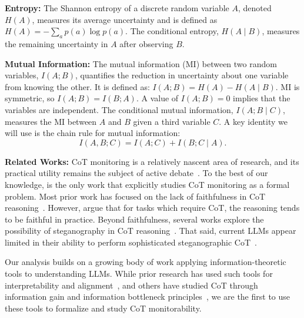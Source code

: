 \documentclass{article}
\theoremstyle{plain}
\begin{document}
\textbf{Entropy:}
The Shannon entropy of a discrete random variable $A$, denoted $H(A)$, measures its average uncertainty and is defined as $H(A) = -\sum_{a} p(a) \log p(a)$. The conditional entropy, $H(A \mid B)$, measures the remaining uncertainty in $A$ after observing $B$.

\textbf{Mutual Information:}
The mutual information (MI) between two random variables, $I(A;B)$, quantifies the reduction in uncertainty about one variable from knowing the other. It is defined as:
\(
    I(A;B) = H(A) - H(A \mid B).
\)
MI is symmetric, so $I(A;B) = I(B;A)$. A value of $I(A;B)=0$ implies that the variables are independent. The conditional mutual information, $I(A;B \mid C)$, measures the MI between $A$ and $B$ given a third variable $C$. A key identity we will use is the chain rule for mutual information:
\begin{equation}
    I(A,B;C) = I(A;C) + I(B;C \mid A).
\end{equation}


\textbf{Related Works:} 
CoT monitoring is a relatively nascent area of research, and its practical utility remains the subject of active debate~\citep{korbak2025chainthoughtmonitorabilitynew, barez2025chain}.
To the best of our knowledge, \citet{baker2025monitoringreasoningmodelsmisbehavior} is the only work that explicitly studies CoT monitoring as a formal problem.
Most prior work has focused on the lack of faithfulness in CoT reasoning~\citep{turpin2023languagemodelsdontsay, lanham2023measuringfaithfulnesschainofthoughtreasoning, chen2025reasoningmodelsdontsay, barez2025chain}.
However, \citet{emmons2025chainthoughtnecessarylanguage} argue that for tasks which require CoT, the reasoning tends to be faithful in practice.
Beyond faithfulness, several works explore the possibility of steganography in CoT reasoning~\citep{motwani2024secretcollusion, mathew2024hiddenplaintextemergence, cooper2025gendistransfer}. That said, current LLMs appear limited in their ability to perform sophisticated steganographic CoT~\citep{zolkowski2025early}.

Our analysis builds on a growing body of work applying information-theoretic tools to understanding LLMs.
While prior research has used such tools for interpretability and alignment~\citep{xu2020usable, belrose2025leaceperfectlinearconcept}, and others have studied CoT through information gain and information bottleneck principles~\citep{ton2025understandingchainofthoughtllmsinformation, lei2025revisiting}, we are the first to use these tools to formalize and study CoT monitorability.
\end{document}
